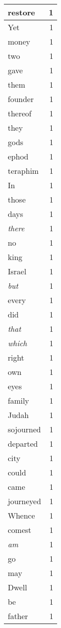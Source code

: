 \begin{center}
\begin{longtable}{l|r}
restore & 1\\ \hline 
Yet & 1\\ \hline 
money & 1\\ \hline 
two & 1\\ \hline 
gave & 1\\ \hline 
them & 1\\ \hline 
founder & 1\\ \hline 
thereof & 1\\ \hline 
they & 1\\ \hline 
gods & 1\\ \hline 
ephod & 1\\ \hline 
teraphim & 1\\ \hline 
In & 1\\ \hline 
those & 1\\ \hline 
days & 1\\ \hline 
\emph{there} & 1\\ \hline 
no & 1\\ \hline 
king & 1\\ \hline 
Israel & 1\\ \hline 
\emph{but} & 1\\ \hline 
every & 1\\ \hline 
did & 1\\ \hline 
\emph{that} & 1\\ \hline 
\emph{which} & 1\\ \hline 
right & 1\\ \hline 
own & 1\\ \hline 
eyes & 1\\ \hline 
family & 1\\ \hline 
Judah & 1\\ \hline 
sojourned & 1\\ \hline 
departed & 1\\ \hline 
city & 1\\ \hline 
could & 1\\ \hline 
came & 1\\ \hline 
journeyed & 1\\ \hline 
Whence & 1\\ \hline 
comest & 1\\ \hline 
\emph{am} & 1\\ \hline 
go & 1\\ \hline 
may & 1\\ \hline 
Dwell & 1\\ \hline 
be & 1\\ \hline 
father & 1\\ \hline 

\end{longtable}
\end{center}
